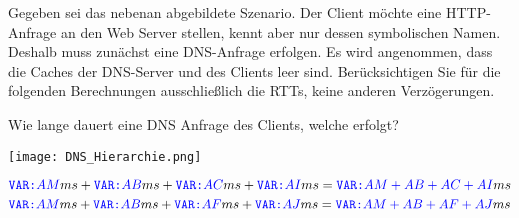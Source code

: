 \question[5]
\begin{minipage}[]{.45\linewidth}
Gegeben sei das nebenan abgebildete Szenario. Der Client möchte eine HTTP-Anfrage
an den Web Server stellen, kennt aber nur dessen symbolischen Namen. Deshalb
muss zunächst eine DNS-Anfrage erfolgen. Es wird angenommen, dass die Caches
der DNS-Server und des Clients leer sind.  Berücksichtigen Sie für die folgenden
Berechnungen ausschließlich die RTTs, keine anderen Verzögerungen.

Wie lange dauert eine DNS Anfrage des Clients, welche  erfolgt?
\end{minipage}
\hfill
\begin{minipage}[]{.45\linewidth}
	\texttt{[image: DNS\_Hierarchie.png]}
\end{minipage}


\begin{solutionbox}{1.5cm}
	\[\VAR{AM}ms + \VAR{AB}ms + \VAR{AC}ms + \VAR{AI}ms = \VAR{AM + AB + AC + AI}ms\]
	\[\VAR{AM}ms + \VAR{AB}ms + \VAR{AF}ms + \VAR{AJ}ms = \VAR{AM + AB + AF + AJ}ms\]
\end{solutionbox}
